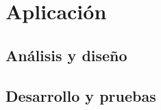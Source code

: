 \chapter{Aplicación}
\label{ch:aplicación}



\section{Análisis y diseño}
\label{secc:análisis y diseño}

\section{Desarrollo y pruebas}

\label{secc:desarrollo y pruebas}






















